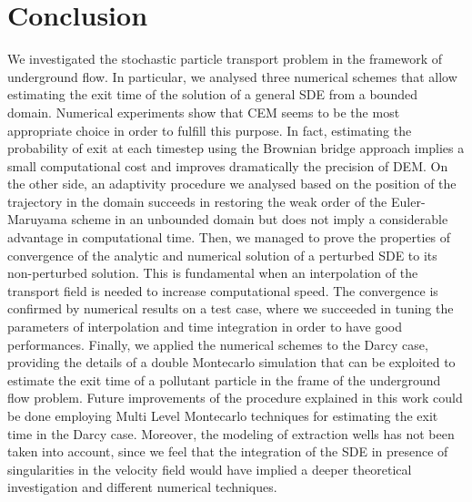 \section{Conclusion}

We investigated the stochastic particle transport problem in the framework of underground flow. In particular, we analysed three numerical schemes that allow estimating the exit time of the solution of a general SDE from a bounded domain. Numerical experiments show that CEM seems to be the most appropriate choice in order to fulfill this purpose. In fact, estimating the probability of exit at each timestep using the Brownian bridge approach implies a small computational cost and improves dramatically the precision of DEM. On the other side, an adaptivity procedure we analysed based on the position of the trajectory in the domain succeeds in restoring the weak order of the Euler-Maruyama scheme in an unbounded domain but does not imply a considerable advantage in computational time. Then, we managed to prove the properties of convergence of the analytic and numerical solution of a perturbed SDE to its non-perturbed solution. This is fundamental when an interpolation of the transport field is needed to increase computational speed. The convergence is confirmed by numerical results on a test case, where we succeeded in tuning the parameters of interpolation and time integration in order to have good performances. Finally, we applied the numerical schemes to the Darcy case, providing the details of a double Montecarlo simulation that can be exploited to estimate the exit time of a pollutant particle in the frame of the underground flow problem. Future improvements of the procedure explained in this work could be done employing Multi Level Montecarlo techniques for estimating the exit time in the Darcy case. Moreover, the modeling of extraction wells has not been taken into account, since we feel that the integration of the SDE in presence of singularities in the velocity field would have implied a deeper theoretical investigation and different numerical techniques.  

